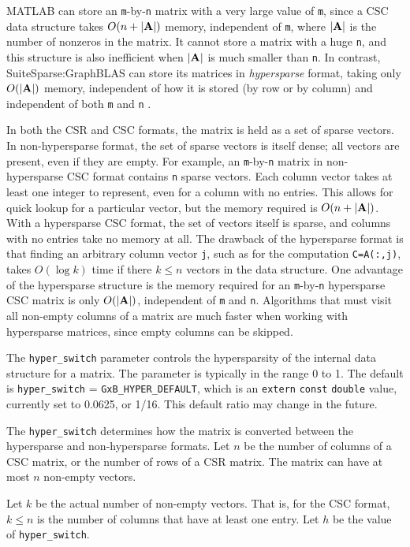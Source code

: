 \documentclass[12pt]{article}
\begin{document}
MATLAB can store an \verb'm'-by-\verb'n' matrix with a very large value of
\verb'm', since a CSC data structure takes $O(n+|{\bf A}|)$ memory, independent
of \verb'm', where $|{\bf A}|$ is the number of nonzeros in the matrix.  It
cannot store a matrix with a huge \verb'n', and this structure is also
inefficient when $|{\bf A}|$ is much smaller than \verb'n'.  In contrast,
SuiteSparse:GraphBLAS can store its matrices in {\em hypersparse} format,
taking only $O(|{\bf A}|)$ memory, independent of how it is stored (by row or
by column) and independent of both \verb'm' and \verb'n'
\cite{BulucGilbert08,BulucGilbert12}.

In both the CSR and CSC formats, the matrix is held as a set of sparse vectors.
In non-hypersparse format, the set of sparse vectors is itself dense; all
vectors are present, even if they are empty.  For example, an
\verb'm'-by-\verb'n' matrix in non-hypersparse CSC format contains \verb'n'
sparse vectors.  Each column vector takes at least one integer to represent,
even for a column with no entries.  This allows for quick lookup for a
particular vector, but the memory required is $O(n+|{\bf A}|)$.  With a
hypersparse CSC format, the set of vectors itself is sparse, and columns with
no entries take no memory at all.  The drawback of the hypersparse format is
that finding an arbitrary column vector \verb'j', such as for the computation
\verb'C=A(:,j)', takes $O(\log k)$ time if there $k \le n$ vectors in the data
structure.  One advantage of the hypersparse structure is the memory required
for an \verb'm'-by-\verb'n' hypersparse CSC matrix is only $O(|{\bf A}|)$,
independent of \verb'm' and \verb'n'.  Algorithms that must visit all non-empty
columns of a matrix are much faster when working with hypersparse matrices,
since empty columns can be skipped.

The \verb'hyper_switch' parameter controls the hypersparsity of the internal
data structure for a matrix.  The parameter is typically in the range 0 to 1.
The default is \verb'hyper_switch' = \verb'GxB_HYPER_DEFAULT', which is an
\verb'extern' \verb'const' \verb'double' value, currently set to 0.0625, or
1/16.  This default ratio may change in the future.

The \verb'hyper_switch' determines how the matrix is converted between the
hypersparse and non-hypersparse formats.  Let $n$ be the number of columns of a
CSC matrix, or the number of rows of a CSR matrix.  The matrix can have at most
$n$ non-empty vectors.

Let $k$ be the actual number of non-empty vectors.  That is, for the CSC
format, $k \le n$ is the number of columns that have at least one entry.  Let
$h$ be the value of \verb'hyper_switch'.
\end{document}
